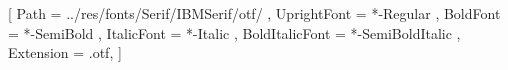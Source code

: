 \setmainfont{IBMPlexSerif}
[
	Path = ../res/fonts/Serif/IBMSerif/otf/ ,
	UprightFont = *-Regular ,
	BoldFont = *-SemiBold ,
	ItalicFont = *-Italic ,
	BoldItalicFont = *-SemiBoldItalic ,
	Extension = .otf,
]